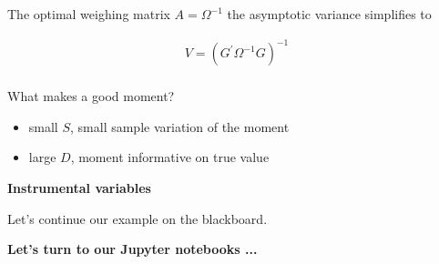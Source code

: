 \begin{frame}

The optimal weighing matrix $A = \Omega^{-1}$ the asymptotic variance simplifies to

\begin{align*}
V = (G^\prime  \Omega^{-1} G)^{-1}\\
\end{align*}

What makes a good moment?
\begin{itemize}
\item small $S$, small sample variation of the moment
\item large $D$, moment informative on true value
\end{itemize}


\end{frame}
\begin{frame}\textbf{Instrumental variables}\vspace{1cm}

\begin{center}
Let's continue our example on the blackboard.
\end{center}

\end{frame}
\begin{frame}\textbf{Let's turn to our Jupyter notebooks ...}

\begin{figure}[htp]\centering
{}
\end{figure}


\end{frame}
